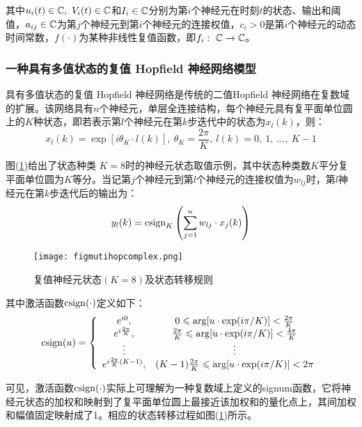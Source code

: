 \documentclass[no-math, withoutpreface]{YangThesis}
\begin{document}
其中$u_i(t)\in \mathbb{C},\ V_i(t)\in \mathbb{C}$和$I_i\in\mathbb{C}$分别为第$i$个神经元在时刻$t$的状态、输出和阈值，$a_{ij}\in\mathbb{C}$为第$j$个神经元到第$i$个神经元的连接权值，$c_i>0$是第$i$个神经元的动态时间常数，$f(\cdot)$为某种非线性复值函数，即$f_i:\ \mathbb{C}\rightarrow\mathbb{C}$。

\subsubsection{一种具有多值状态的复值 Hopf\/ield 神经网络模型}
具有多值状态的复值 Hopf\/ield 神经网络是传统的二值Hopf\/ield 神经网络在复数域的扩展。该网络具有$n$个神经元，单层全连接结构，每个神经元具有复平面单位圆上的$K$种状态，即若表示第$l$个神经元在第$k$步迭代中的状态为$x_l(k)$，则：
\begin{equation}
x_l(k)=\exp[{i\theta_K\cdot l(k)}],\ \theta_K=\frac{2\pi}{K},\ l(k)=0,\ 1,\ \ldots,\ K-1
\end{equation}
 
 图(\ref{figmulti})给出了状态种类 $K=8$时的神经元状态取值示例，其中状态种类数$K$平分复平面单位圆为$K$等分。当记第$j$个神经元到第$l$个神经元的连接权值为$w_{lj}$时，第$l$神经元在第$k$步迭代后的输出为：
\begin{equation}
y_l(k) = \operatorname{csign}_K\left(\sum\limits_{j=1}^n w_{lj}\cdot x_j(k)\right)
\label{eqiter}
\end{equation}
\begin{figure}[!htbp]
	\centering
	\texttt{[image: figmutihopcomplex.png]}
	\caption{复值神经元状态$(K=8)$及状态转移规则}
     \label{figmulti}
\end{figure}

其中激活函数$\operatorname{csign}(\cdot)$定义如下：
\begin{equation}
\operatorname{csign}(u)=
\left\{
\begin{array}{cc}
	e^{i0},&0\leqslant\arg[u\cdot\exp(i\pi/K)]<\frac{2\pi}{K}\\
	e^{i\frac{2\pi}{K}},&\frac{2\pi}{K}\leqslant\arg[u\cdot\exp(i\pi/K)]<\frac{4\pi}{K}\\
	\vdots&\vdots\\
	e^{i\frac{2\pi}{K}(K-1)},&(K-1)\frac{2\pi}{K}
	                                  \leqslant\arg[u\cdot\exp(i\pi/K)]<2\pi\\
\end{array}
\right.
\end{equation}

可见，激活函数$\operatorname{csign}(\cdot)$实际上可理解为一种复数域上定义的signum函数，它将神经元状态的加权和映射到了复平面单位圆上最接近该加权和的量化点上，其间加权和幅值固定映射成了1。相应的状态转移过程如图(\ref{figmulti})所示。
\end{document}
